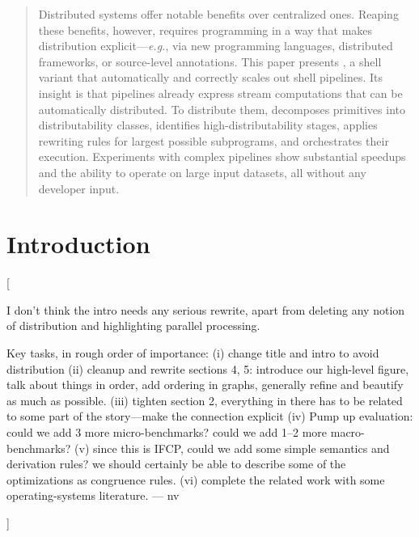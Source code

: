 \documentclass[letterpaper,twocolumn,10pt]{article}
\newcommand{\eg}{{\em e.g.}, }
\newcommand{\nv}[1]{[{\color{cyan}#1 --- nv}]}
\begin{document}
\begin{abstract}
  Distributed systems offer notable benefits over centralized ones.
  Reaping these benefits, however, requires programming in a way that makes distribution explicit---\eg via new programming languages, distributed frameworks, or source-level annotations.
  This paper presents \sys, a shell variant that automatically and correctly scales out \unix shell pipelines. 
  Its insight is that pipelines already express stream computations that can be automatically distributed.
  To distribute them, \sys
    decomposes primitives into distributability classes,
    identifies high-distributability stages,
    applies rewriting rules for largest possible subprograms,
    and orchestrates their execution.
Experiments with complex pipelines show substantial speedups and the ability to operate on large input datasets, all without any developer input.
\end{abstract}

% 
% 


\section{Introduction}
\label{intro}

\nv{I don't think the intro needs any serious rewrite, apart from deleting any
notion of distribution and highlighting parallel processing.

Key tasks, in rough order of importance:
  (i) change title and intro to avoid distribution
  (ii) cleanup and rewrite sections 4, 5: introduce our high-level figure, talk
  about things in order, add ordering in graphs, generally refine and beautify
  as much as possible.
  (iii) tighten section 2, everything in there has to be related to some part of
  the story---make the connection explicit
  (iv) Pump up evaluation: could we add 3 more micro-benchmarks? could we add
  1--2 more macro-benchmarks?
  (v) since this is IFCP, could we add some simple semantics and derivation
  rules? we should certainly be able to describe some of the optimizations as
  congruence rules.
  (vi) complete the related work with some operating-systems literature.
}
  
\end{document}
